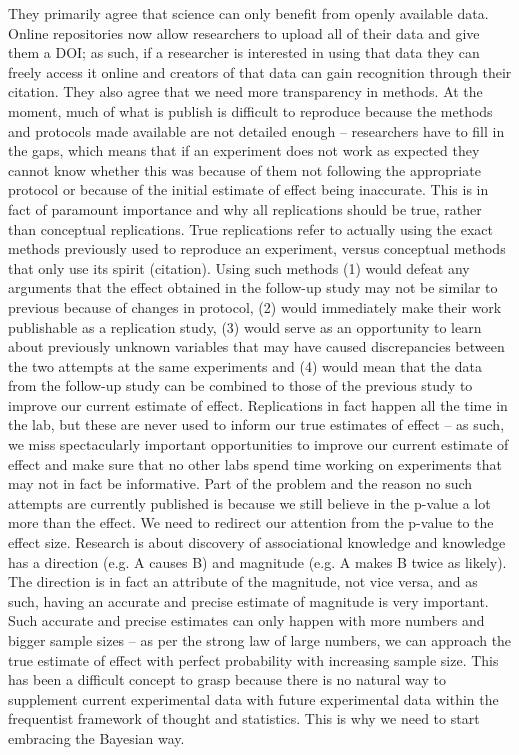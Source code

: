 \documentclass[12pt]{article}
\begin{document}
They primarily agree that science can only benefit from openly available data. Online repositories now allow researchers to upload all of their data and give them a DOI; as such, if a researcher is interested in using that data they can freely access it online and creators of that data can gain recognition through their citation. They also agree that we need more transparency in methods. At the moment, much of what is publish is difficult to reproduce because the methods and protocols made available are not detailed enough – researchers have to fill in the gaps, which means that if an experiment does not work as expected they cannot know whether this was because of them not following the appropriate protocol or because of the initial estimate of effect being inaccurate. This is in fact of paramount importance and why all replications should be true, rather than conceptual replications.
True replications refer to actually using the exact methods previously used to reproduce an experiment, versus conceptual methods that only use its spirit (citation). Using such methods (1) would defeat any arguments that the effect obtained in the follow-up study may not be similar to previous because of changes in protocol, (2) would immediately make their work publishable as a replication study, (3) would serve as an opportunity to learn about previously unknown variables that may have caused discrepancies between the two attempts at the same experiments and (4) would mean that the data from the follow-up study can be combined to those of the previous study to improve our current estimate of effect. Replications in fact happen all the time in the lab, but these are never used to inform our true estimates of effect – as such, we miss spectacularly important opportunities to improve our current estimate of effect and make sure that no other labs spend time working on experiments that may not in fact be informative. Part of the problem and the reason no such attempts are currently published is because we still believe in the p-value a lot more than the effect.
We need to redirect our attention from the p-value to the effect size. Research is about discovery of associational knowledge and knowledge has a direction (e.g. A causes B) and magnitude (e.g. A makes B twice as likely). The direction is in fact an attribute of the magnitude, not vice versa, and as such, having an accurate and precise estimate of magnitude is very important. Such accurate and precise estimates can only happen with more numbers and bigger sample sizes – as per the strong law of large numbers, we can approach the true estimate of effect with perfect probability with increasing sample size. This has been a difficult concept to grasp because there is no natural way to supplement current experimental data with future experimental data within the frequentist framework of thought and statistics. This is why we need to start embracing the Bayesian way.
\end{document}
